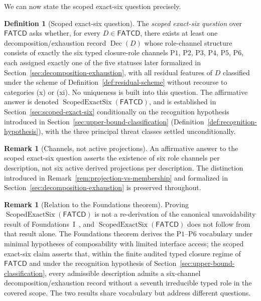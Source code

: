 \documentclass[11pt]{article}
\theoremstyle{definition}
\newtheorem{definition}[theorem]{Definition}
\newtheorem{remark}[theorem]{Remark}
\newcommand{\FATCD}{\ensuremath{\mathsf{FATCD}}}
\newcommand{\Dec}[1]{\ensuremath{\operatorname{Dec}\!\left(#1\right)}}
\newcommand{\ScopedExactSix}[1]{\ensuremath{\operatorname{ScopedExactSix}\!\left(#1\right)}}
\newcommand{\Pone}{\ensuremath{\mathrm{P1}}}
\newcommand{\Ptwo}{\ensuremath{\mathrm{P2}}}
\newcommand{\Pthree}{\ensuremath{\mathrm{P3}}}
\newcommand{\Pfour}{\ensuremath{\mathrm{P4}}}
\newcommand{\Pfive}{\ensuremath{\mathrm{P5}}}
\newcommand{\Psix}{\ensuremath{\mathrm{P6}}}
\begin{document}
We can now state the scoped exact-six question precisely.

\begin{definition}[Scoped exact-six question]\label{def:scoped-exact-six-question}
The \emph{scoped exact-six question} over \FATCD{} asks whether, for every
\(D \in \FATCD{}\), there exists at least one decomposition/exhaustion record
\(\Dec{D}\) whose role-channel structure consists of exactly the six typed
closure-role channels \Pone{}, \Ptwo{}, \Pthree{}, \Pfour{}, \Pfive{},
\Psix{}, each assigned exactly one of the five statuses later formalized in
Section~\ref{sec:decomposition-exhaustion}, with all residual features of
\(D\) classified under the scheme of Definition~\ref{def:residual-scheme}
without recourse to categories (x) or (xi). No uniqueness is built into this
question. The affirmative answer is denoted \(\ScopedExactSix{\FATCD{}}\), and is
established in Section~\ref{sec:scoped-exact-six} conditionally on the recognition
hypothesis introduced in Section~\ref{sec:upper-bound-classification}
(Definition~\ref{def:recognition-hypothesis}), with the three principal threat
classes settled unconditionally.
\end{definition}

\begin{remark}[Channels, not active projections]\label{rem:channel-vs-activation-reminder}
An affirmative answer to the scoped exact-six question asserts the
existence of six role channels per description, not six active derived
projections per description. The distinction introduced in
Remark~\ref{rem:projection-vs-membership} and formalized in
Section~\ref{sec:decomposition-exhaustion} is preserved throughout.
\end{remark}

\begin{remark}[Relation to the Foundations theorem]\label{rem:fatcd-foundations-relation}
Proving \(\ScopedExactSix{\FATCD{}}\) is not a re-derivation of the
canonical unavoidability result of Foundations~I~\citep{Tsiokos2026SixBirdsFoundations},
and \(\ScopedExactSix{\FATCD{}}\) does not follow from that result
alone. The Foundations theorem derives the \Pone{}--\Psix{} vocabulary
under minimal hypotheses of composability with limited interface
access; the scoped exact-six claim asserts that, within the finite
audited typed closure regime of \FATCD{} and under the recognition hypothesis of
Section~\ref{sec:upper-bound-classification}, every admissible description
admits a six-channel decomposition/exhaustion record without a seventh
irreducible typed role in the covered scope. The two results share
vocabulary but address different questions.
\end{remark}
\end{document}
